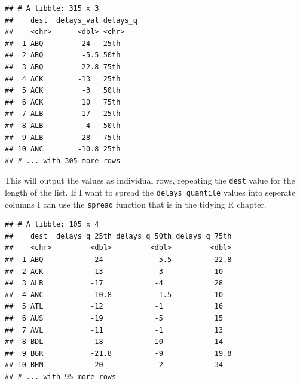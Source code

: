 \documentclass[]{book}
\newenvironment{Shaded}{\begin{snugshade}}{\end{snugshade}}
\newcommand{\DataTypeTok}[1]{\textcolor[rgb]{0.13,0.29,0.53}{#1}}
\newcommand{\KeywordTok}[1]{\textcolor[rgb]{0.13,0.29,0.53}{\textbf{#1}}}
\newcommand{\NormalTok}[1]{#1}
\newcommand{\OperatorTok}[1]{\textcolor[rgb]{0.81,0.36,0.00}{\textbf{#1}}}
\newcommand{\StringTok}[1]{\textcolor[rgb]{0.31,0.60,0.02}{#1}}
\theoremstyle{definition}
\theoremstyle{definition}
\theoremstyle{definition}
\theoremstyle{remark}
\begin{document}
\begin{Shaded}
\end{Shaded}

\begin{verbatim}
## # A tibble: 315 x 3
##    dest  delays_val delays_q
##    <chr>      <dbl> <chr>   
##  1 ABQ        -24   25th    
##  2 ABQ         -5.5 50th    
##  3 ABQ         22.8 75th    
##  4 ACK        -13   25th    
##  5 ACK         -3   50th    
##  6 ACK         10   75th    
##  7 ALB        -17   25th    
##  8 ALB         -4   50th    
##  9 ALB         28   75th    
## 10 ANC        -10.8 25th    
## # ... with 305 more rows
\end{verbatim}

This will output the values as individual rows, repeating the
\texttt{dest} value for the length of the list. If I want to spread the
\texttt{delays\_quantile} values into seperate columns I can use the
\texttt{spread} function that is in the tidying R chapter.

\begin{Shaded}
\end{Shaded}

\begin{verbatim}
## # A tibble: 105 x 4
##    dest  delays_q_25th delays_q_50th delays_q_75th
##    <chr>         <dbl>         <dbl>         <dbl>
##  1 ABQ           -24            -5.5          22.8
##  2 ACK           -13            -3            10  
##  3 ALB           -17            -4            28  
##  4 ANC           -10.8           1.5          10  
##  5 ATL           -12            -1            16  
##  6 AUS           -19            -5            15  
##  7 AVL           -11            -1            13  
##  8 BDL           -18           -10            14  
##  9 BGR           -21.8          -9            19.8
## 10 BHM           -20            -2            34  
## # ... with 95 more rows
\end{verbatim}
\end{document}
